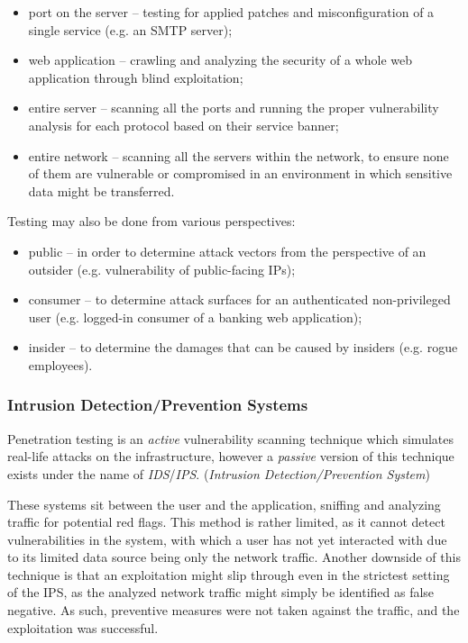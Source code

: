 \documentclass[a4paper,12pt]{article}
\begin{document}
	\vspace{-0.15in}
	\begin{itemize}
		\item port on the server -- testing for applied patches and misconfiguration of a single service (e.g. an SMTP server);
		\item web application -- crawling and analyzing the security of a whole web application through blind exploitation;
		\item entire server -- scanning all the ports and running the proper vulnerability analysis for each protocol based on their service banner;
		\item entire network -- scanning all the servers within the network, to ensure none of them are vulnerable or compromised in an environment in which sensitive data might be transferred.
	\end{itemize}
	\vspace{-0.15in}
	
	\noindent Testing may also be done from various perspectives:
	
	\vspace{-0.15in}
	\begin{itemize}
		\item public -- in order to determine attack vectors from the perspective of an outsider (e.g. vulnerability of public-facing IPs);
		\item consumer -- to determine attack surfaces for an authenticated non-privileged user (e.g. logged-in consumer of a banking web application);
		\item insider -- to determine the damages that can be caused by insiders (e.g. rogue employees).
	\end{itemize}
	\vspace{-0.15in}
	
\subsubsection{Intrusion Detection/Prevention Systems}
	
	Penetration testing is an \textit{active} vulnerability scanning technique which simulates real-life attacks on the infrastructure, however a \textit{passive} version of this technique exists under the name of \textit{IDS}/\textit{IPS}. (\textit{Intrusion Detection/Prevention System})
	
	These systems sit between the user and the application, sniffing and analyzing traffic for potential red flags. This method is rather limited, as it cannot detect vulnerabilities in the system, with which a user has not yet interacted with due to its limited data source being only the network traffic. Another downside of this technique is that an exploitation might slip through even in the strictest setting of the IPS, as the analyzed network traffic might simply be identified as false negative. As such, preventive measures were not taken against the traffic, and the exploitation was successful.
	
\end{document}
